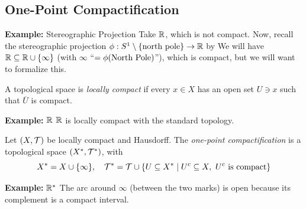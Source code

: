 \subsection*{One-Point Compactification}
\sectionspace

\begin{example}{\textbf{Example:} Stereographic Projection}
    Take $\R$, which is not compact. Now, recall the stereographic projection $\phi : S^1 \setminus \{\tt{north pole}\} \to \R$ by
    We will have $\R \subseteq \R \cup \{\infty\}$ (with $\infty$ ``$= \phi(\tt{North Pole})$''), which is compact, but we will want to formalize this.
\end{example}

\begin{definition}
    A topological space is \emph{locally compact} if every $x \in X$ has an open set $U \ni x$ such that $\overline{U}$ is compact.
\end{definition}

\begin{example}{\textbf{Example:} $\R$}
    $\R$ is locally compact with the standard topology.
\end{example}

\begin{definition}
    Let $(X, \cal{T})$ be locally compact and Hausdorff. The \emph{one-point compactification} is a topological space $(X^{*}, \cal{T}^{*})$, with
    \[ X^{*} = X \cup \{\infty\}, \quad \cal{T}^{*} = \cal{T} \cup \{U \subseteq X^{*} \mid U^{c} \subseteq X,\ U^{c} \tt{ is compact}\} \]
\end{definition}

\begin{example}{\textbf{Example:} $\R^{*}$}
    The arc around $\infty$ (between the two marks) is open because its complement is a compact interval.
\end{example}

